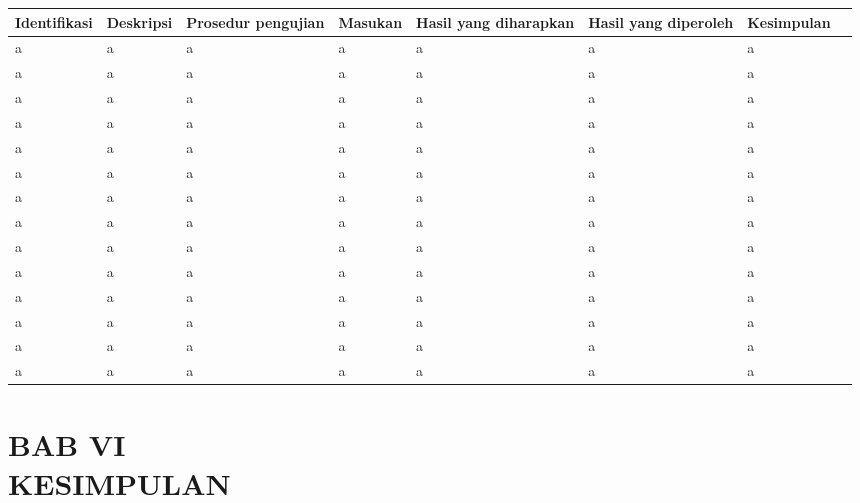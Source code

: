 \documentclass[12pt]{article}
\begin{document}
\begin{enumerate}[label=\textbf{5.\arabic*.}]
\begin{enumerate}[label=\textbf{5.2.\arabic*.}]
\begin{landscape}
\begin{longtable}{ |l|l|l|l|l|l|l|l| }
                \hline
                \textbf{Identifikasi} & \textbf{Deskripsi} & \textbf{Prosedur pengujian}  & \textbf{Masukan}  & \textbf{Hasil yang diharapkan}  & \textbf{Hasil yang diperoleh}  & \textbf{Kesimpulan}\\
                \hline
                \endhead
              
 
                
                \hline
                a & a & a & a & a & a & a \\
                a & a & a & a & a & a & a \\
                a & a & a & a & a & a & a \\
                a & a & a & a & a & a & a \\
                a & a & a & a & a & a & a \\
                a & a & a & a & a & a & a \\
                a & a & a & a & a & a & a \\
                a & a & a & a & a & a & a \\
                a & a & a & a & a & a & a \\
                a & a & a & a & a & a & a \\
                a & a & a & a & a & a & a \\
                a & a & a & a & a & a & a \\
                a & a & a & a & a & a & a \\
                a & a & a & a & a & a & a \\

                \hline
    
            \end{longtable}
            
        \end{landscape}

            
               
        

    
    \end{enumerate}


\end{enumerate}

\newpage

\section[BAB VI KESIMPULAN]{BAB VI\\KESIMPULAN}
\end{document}
